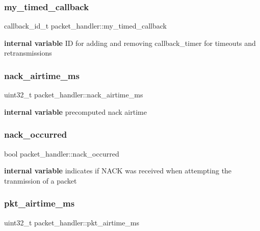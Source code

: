 \subsubsection{\texorpdfstring{my\+\_\+timed\+\_\+callback}{my\_timed\_callback}}
{\footnotesize\ttfamily callback\+\_\+id\+\_\+t packet\+\_\+handler\+::my\+\_\+timed\+\_\+callback}

{\bfseries internal variable} ID for adding and removing callback\+\_\+timer for timeouts and retransmissions \mbox{\label{structpacket__handler_a7a309108dc7426e425041b842ef052c7}} 
\subsubsection{\texorpdfstring{nack\+\_\+airtime\+\_\+ms}{nack\_airtime\_ms}}
{\footnotesize\ttfamily uint32\+\_\+t packet\+\_\+handler\+::nack\+\_\+airtime\+\_\+ms}

{\bfseries internal variable} precomputed nack airtime \mbox{\label{structpacket__handler_a8ac1ba5fd97235efa70445eaf7538b28}} 
\subsubsection{\texorpdfstring{nack\+\_\+occurred}{nack\_occurred}}
{\footnotesize\ttfamily bool packet\+\_\+handler\+::nack\+\_\+occurred}

{\bfseries internal variable} indicates if N\+A\+CK was received when attempting the tranmission of a packet \mbox{\label{structpacket__handler_af9c15e3494d3d3eb7a47d45b69862ebf}} 
\subsubsection{\texorpdfstring{pkt\+\_\+airtime\+\_\+ms}{pkt\_airtime\_ms}}
{\footnotesize\ttfamily uint32\+\_\+t packet\+\_\+handler\+::pkt\+\_\+airtime\+\_\+ms}

